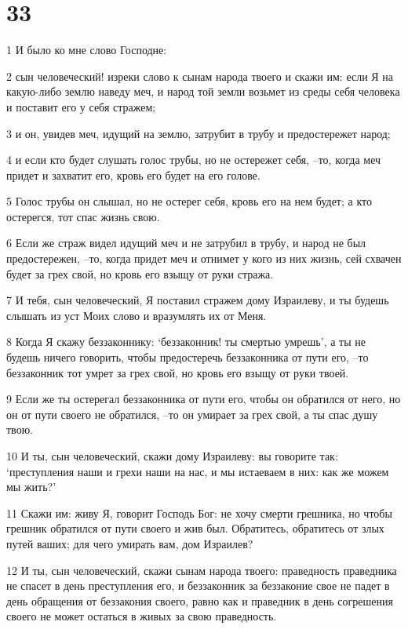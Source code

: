\chapter{33}

\par 1 И было ко мне слово Господне:
\par 2 сын человеческий! изреки слово к сынам народа твоего и скажи им: если Я на какую-либо землю наведу меч, и народ той земли возьмет из среды себя человека и поставит его у себя стражем;
\par 3 и он, увидев меч, идущий на землю, затрубит в трубу и предостережет народ;
\par 4 и если кто будет слушать голос трубы, но не остережет себя, --то, когда меч придет и захватит его, кровь его будет на его голове.
\par 5 Голос трубы он слышал, но не остерег себя, кровь его на нем будет; а кто остерегся, тот спас жизнь свою.
\par 6 Если же страж видел идущий меч и не затрубил в трубу, и народ не был предостережен, --то, когда придет меч и отнимет у кого из них жизнь, сей схвачен будет за грех свой, но кровь его взыщу от руки стража.
\par 7 И тебя, сын человеческий, Я поставил стражем дому Израилеву, и ты будешь слышать из уст Моих слово и вразумлять их от Меня.
\par 8 Когда Я скажу беззаконнику: `беззаконник! ты смертью умрешь', а ты не будешь ничего говорить, чтобы предостеречь беззаконника от пути его, --то беззаконник тот умрет за грех свой, но кровь его взыщу от руки твоей.
\par 9 Если же ты остерегал беззаконника от пути его, чтобы он обратился от него, но он от пути своего не обратился, --то он умирает за грех свой, а ты спас душу твою.
\par 10 И ты, сын человеческий, скажи дому Израилеву: вы говорите так: `преступления наши и грехи наши на нас, и мы истаеваем в них: как же можем мы жить?'
\par 11 Скажи им: живу Я, говорит Господь Бог: не хочу смерти грешника, но чтобы грешник обратился от пути своего и жив был. Обратитесь, обратитесь от злых путей ваших; для чего умирать вам, дом Израилев?
\par 12 И ты, сын человеческий, скажи сынам народа твоего: праведность праведника не спасет в день преступления его, и беззаконник за беззаконие свое не падет в день обращения от беззакония своего, равно как и праведник в день согрешения своего не может остаться в живых за свою праведность.
